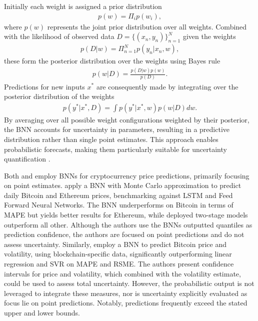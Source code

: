 Initially each weight is assigned a prior distribution
\begin{equation}
    \begin{gathered}
        p(w) = \Pi_{i} p(w_i),
    \end{gathered}
\end{equation}
where $p(w)$ represents the joint prior distribution over all weights. Combined with the likelihood of observed data $D = \{(x_n,y_n)\}_{n=1}^N$ given the weights
\begin{equation}
    \begin{gathered}    
        p(D|w) = \Pi_{n=1}^Np(y_n|x_n,w),
    \end{gathered}
\end{equation}
these form the posterior distribution over the weights using Bayes rule \parencite[p. 46]{pml1Book}
\begin{equation}
    \begin{gathered}
        p(w|D) = \frac{p(D|w)p(w)}{p(D)}.
    \end{gathered}
    \label{eq:bayes_theorem} 
\end{equation}
Predictions for new inputs $x^*$ are consequently made by integrating over the posterior distribution of the weights
\begin{equation}
    \begin{gathered}
        p(y^*|x^*,D) = \int p(y^*|x^*,w)p(w|D)dw.
    \end{gathered}
\end{equation}
By averaging over all possible weight configurations weighted by their posterior, the BNN accounts for uncertainty in parameters, resulting in a predictive distribution rather than single point estimates. This approach enables probabilistic forecasts, making them particularly suitable for uncertainty quantification \parencite{jospin2022hands}.

Both \textcite{cocco2021predictions} and \textcite{jang2018empirical} employ BNNs for cryptocurrency price predictions, primarily focusing on point estimates. \textcite{cocco2021predictions} apply a BNN with Monte Carlo approximation to predict daily Bitcoin and Ethereum prices, benchmarking against LSTM and Feed Forward Neural Networks. The BNN underperforms on Bitcoin in terms of MAPE but yields better results for Ethereum, while deployed two-stage models outperform all other. Although the authors use the BNNs outputted quantiles as prediction confidence, the authors are focused on point predictions and do not assess uncertainty. Similarly, \textcite{jang2018empirical} employ a BNN to predict Bitcoin price and volatility, using blockchain-specific data, significantly outperforming linear regression and SVR on MAPE and RSME. The authors present confidence intervals for price and volatility, which combined with the volatility estimate, could be used to assess total uncertainty. However, the probabilistic output is not leveraged to integrate these measures, nor is uncertainty explicitly evaluated as focus lie on point predictions. Notably, predictions frequently exceed the stated upper and lower bounds. 

